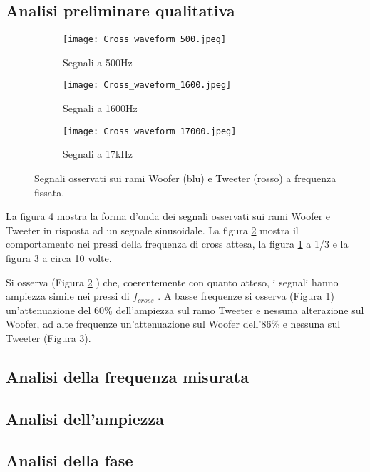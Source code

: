 \documentclass[../Relazione_circuiti]{subfiles}
\begin{document}
\subsection{Analisi preliminare qualitativa}

  \begin{figure}[H]
    \centering

    \begin{subfigure}[b]{0.3\textwidth}
      \centering
      \texttt{[image: Cross\_waveform\_500.jpeg]}

      \caption{Segnali a 500Hz}
      \label{fig:signal_500}

    \end{subfigure}
    \begin{subfigure}[b]{0.3\textwidth}
      \centering
      \texttt{[image: Cross\_waveform\_1600.jpeg]}

      \caption{Segnali a 1600Hz}
      \label{fig:signal_1600}

    \end{subfigure}
    \begin{subfigure}[b]{0.3\textwidth}
      \centering
      \texttt{[image: Cross\_waveform\_17000.jpeg]}

      \caption{Segnali a 17kHz}
      \label{fig:signal_17k}

    \end{subfigure}
    \hfill

    \caption{Segnali osservati sui rami Woofer (blu) e Tweeter (rosso)
      a frequenza fissata.}
    \label{fig:signal_waveforms}

  \end{figure}

  La figura \ref{fig:signal_waveforms}
  mostra la forma d'onda dei segnali osservati sui rami Woofer e Tweeter in risposta ad un segnale sinusoidale. La
  figura \ref{fig:signal_1600} mostra il comportamento nei pressi della frequenza di cross attesa, la figura
  \ref{fig:signal_500} a 1/3 e la figura \ref{fig:signal_17k} a circa 10 volte.

  Si osserva (Figura \ref{fig:signal_1600}
  ) che, coerentemente con quanto atteso, i segnali hanno ampiezza simile nei pressi di $f_{cross}$
  . A basse frequenze si osserva (Figura \ref{fig:signal_500}) un'attenuazione del 60\%
  dell'ampiezza sul ramo Tweeter e nessuna alterazione sul Woofer, ad alte frequenze un'attenuazione sul Woofer
  dell'86\% e nessuna sul Tweeter (Figura \ref{fig:signal_17k}).

\subsection{Analisi della frequenza misurata}

\subsection{Analisi dell'ampiezza}

\subsection{Analisi della fase}
\end{document}
